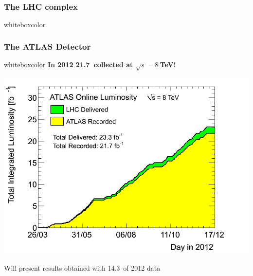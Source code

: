 

\begin{frame}\frametitle{The LHC complex}
\footnotesize\centering
\begin{minipage}{.9\textwidth}
\pause
\begin{beamercolorbox}[wd=.99\textwidth,rounded=true,shadow=true]{whiteboxcolor}\centering\scriptsize

\end{beamercolorbox}

\end{minipage}

\myskip

\end{frame}



\begin{frame}\frametitle{The ATLAS Detector}
\footnotesize\centering

\begin{minipage}{.6\textwidth}\centering\pause
\hspace{2cm}\begin{beamercolorbox}[wd=.9\textwidth,rounded=true,shadow=true]{whiteboxcolor}\centering
{\bfseries In 2012 21.7\ifb\  collected at $\sqrt{s}=8~$TeV!}
\vspace{.3cm}

\includegraphics[width=.8\textwidth]{pics/sumLumiByDay2012}

\vspace{\baselineskip}
\end{beamercolorbox}

\end{minipage}

\myskip
Will present results obtained with \alert{14.3\ifb}\ of 2012 data

\end{frame}
